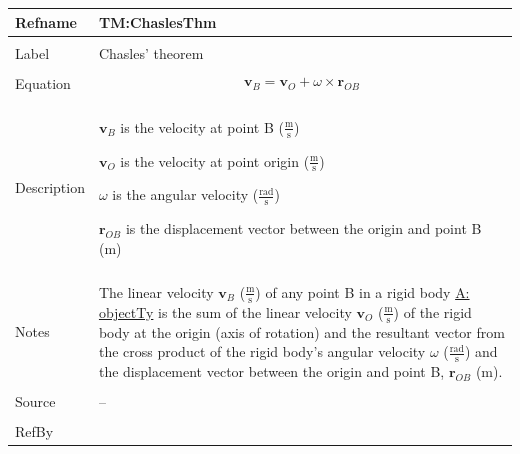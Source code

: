 \documentclass[12pt]{article}
\begin{document}
\noindent \begin{minipage}{\textwidth}
\begin{tabular}{>{\raggedright}p{}>{\raggedright\arraybackslash}p{}}
\toprule \textbf{Refname} & \textbf{TM:ChaslesThm}
\label{TM:ChaslesThm}
\\ \midrule \\
Label & Chasles' theorem
\\ \midrule \\
Equation & \begin{displaymath}
           {\mathbf{v}_{B}}={\mathbf{v}_{O}}+ω\times{\mathbf{r}_{OB}}
           \end{displaymath}
\\ \midrule \\
Description & \begin{symbDescription}
              \item{${\mathbf{v}_{B}}$ is the velocity at point B ($\frac{\text{m}}{\text{s}}$)}
              \item{${\mathbf{v}_{O}}$ is the velocity at point origin ($\frac{\text{m}}{\text{s}}$)}
              \item{$ω$ is the angular velocity ($\frac{\text{rad}}{\text{s}}$)}
              \item{${\mathbf{r}_{OB}}$ is the displacement vector between the origin and point B (m)}
              \end{symbDescription}
\\ \midrule \\
Notes & The linear velocity ${\mathbf{v}_{B}}$ ($\frac{\text{m}}{\text{s}}$) of any point B in a rigid body \hyperref[assumpOT]{A: objectTy} is the sum of the linear velocity ${\mathbf{v}_{O}}$ ($\frac{\text{m}}{\text{s}}$) of the rigid body at the origin (axis of rotation) and the resultant vector from the cross product of the rigid body's angular velocity $ω$ ($\frac{\text{rad}}{\text{s}}$) and the displacement vector between the origin and point B, ${\mathbf{r}_{OB}}$ (m).
\\ \midrule \\
Source & --
\\ \midrule \\
RefBy & 
\\ \bottomrule
\end{tabular}
\end{minipage}
\par~
\end{document}
